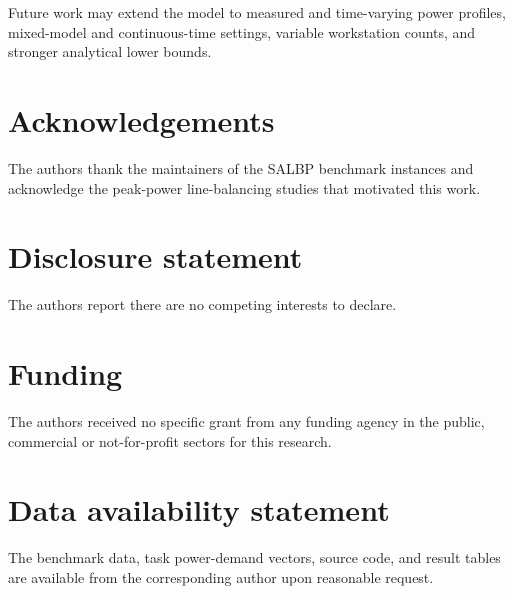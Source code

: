 \documentclass[]{interact}
\theoremstyle{plain}
\theoremstyle{definition}
\theoremstyle{remark}
\begin{document}
Future work may extend the model to measured and time-varying power profiles, mixed-model and continuous-time settings, variable workstation counts, and stronger analytical lower bounds.

\section*{Acknowledgements}

The authors thank the maintainers of the SALBP benchmark instances and acknowledge the peak-power line-balancing studies that motivated this work.

\section*{Disclosure statement}

The authors report there are no competing interests to declare.

\section*{Funding}

The authors received no specific grant from any funding agency in the public, commercial or not-for-profit sectors for this research.

\section*{Data availability statement}

The benchmark data, task power-demand vectors, source code, and result tables are available from the corresponding author upon reasonable request.



\end{document}
